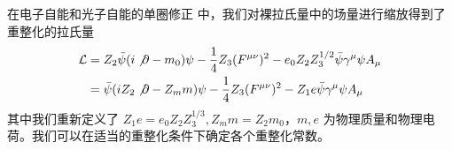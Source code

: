 

在电子自能和光子自能的单圈修正 中，我们对裸拉氏量中的场量进行缩放得到了重整化的拉氏量
\begin{equation}
\begin{aligned}
\mathcal{L} &= Z_2\bar\psi (i\not\partial - m_0)\psi - \frac{1}{4}Z_3 (F^{\mu\nu})^2-e_0Z_2Z_3^{1/2} \bar\psi \gamma^\mu\psi A_\mu\\
&=\bar\psi (iZ_2\not\partial - Z_m m)\psi - \frac{1}{4}Z_3 (F^{\mu\nu})^2-Z_1 e \bar\psi \gamma^\mu\psi A_\mu
\end{aligned}
\end{equation}
其中我们重新定义了 $Z_1e=e_0 Z_2 Z_3^{1/3},Z_m m=Z_2 m_0$，$m,e$ 为物理质量和物理电荷。我们可以在适当的重整化条件下确定各个重整化常数。

